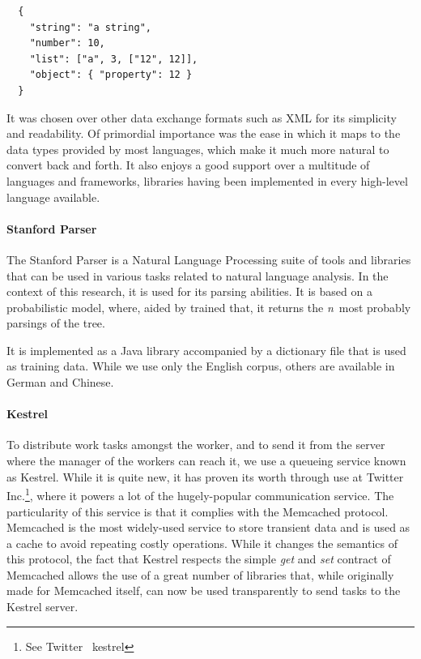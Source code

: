 \begin{verbatim}
  {
    "string": "a string",
    "number": 10,
    "list": ["a", 3, ["12", 12]],
    "object": { "property": 12 }
  }
\end{verbatim}

It was chosen over other data exchange formats such as XML for its simplicity and readability. Of primordial importance was the ease in which it maps to the data types provided by most languages, which make it much more natural to convert back and forth. It also enjoys a good support over a multitude of languages and frameworks, libraries having been implemented in every high-level language available.


\paragraph{Stanford Parser} %
\label{par:stanford_parser}

The Stanford Parser is a Natural Language Processing suite of tools and libraries that can be used in various tasks related to natural language analysis. In the context of this research, it is used for its parsing abilities. It is based on a probabilistic model, where, aided by trained that, it returns the \emph{n}\ most probably parsings of the tree.

It is implemented as a Java library accompanied by a dictionary file that is used as training data. While we use only the English corpus, others are available in German and Chinese.


\paragraph{Kestrel} %
\label{par:kestrel}

To distribute work tasks amongst the worker, and to send it from the server where the manager of the workers can reach it, we use a queueing service known as Kestrel. While it is quite new, it has proven its worth through use at Twitter Inc.\footnote{See Twitter \amper\ kestrel}, where it powers a lot of the hugely-popular communication service. The particularity of this service is that it complies with the Memcached protocol. Memcached is the most widely-used service to store transient data and is used as a cache to avoid repeating costly operations. While it changes the semantics of this protocol, the fact that Kestrel respects the simple \emph{get} and \emph{set} contract of Memcached allows the use of a great number of libraries that, while originally made for Memcached itself, can now be used transparently to send tasks to the Kestrel server.

